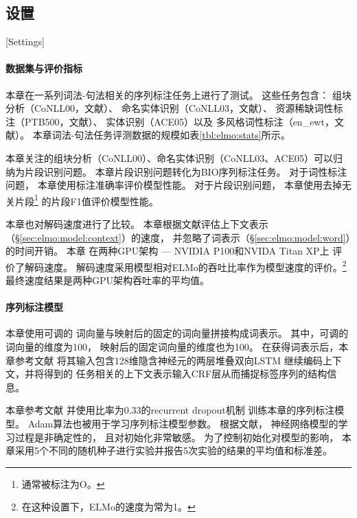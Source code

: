 \subsection{设置}[Settings]
\paragraph{数据集与评价指标}
本章在一系列词法-句法相关的序列标注任务\cite{reimers-gurevych:2017:EMNLP2017}上进行了测试。
这些任务包含：
组块分析（CoNLL00，文献）、
命名实体识别（CoNLL03，文献）、
资源稀缺词性标注（PTB500，文献）、
实体识别（ACE05）以及
多风格词性标注（en\_ewt，文献）。
本章词法-句法任务评测数据的规模如表\ref{tbl:elmo:stats}所示。

本章关注的组块分析（CoNLL00）、命名实体识别（CoNLL03、ACE05）可以归纳为片段识别问题。
本章片段识别问题转化为BIO序列标注任务。
对于词性标注问题，
本章使用标注准确率评价模型性能。
对于片段识别问题，
本章使用去掉无关片段\footnote{通常被标注为O。}
的片段F1值评价模型性能。

本章也对解码速度进行了比较。
本章根据文献评估上下文表示（\S\ref{sec:elmo:model:context}）的速度，
并忽略了词表示（\S\ref{sec:elmo:model:word}）的时间开销。
本章
在两种GPU架构 --- NVIDIA P100和NVIDA Titan XP上
评价了解码速度。
解码速度采用模型相对ELMo的吞吐比率作为模型速度的评价。\footnote{在这种设置下，ELMo的速度为常为1。}
最终速度结果是两种GPU架构吞吐率的平均值。

\paragraph{序列标注模型}
本章使用可调的
词向量与映射后的固定的词向量拼接构成词表示。
其中，可调的词向量的维度为100，
映射后的固定词向量的维度也为100。
在获得词表示后，本章参考文献
将其输入包含128维隐含神经元的两层堆叠双向LSTM\cite{ma-hovy:2016:P16-1}
继续编码上下文，并将得到的
任务相关的上下文表示输入CRF层从而捕捉标签序列的结构信息。

本章参考文献
并使用比率为0.33的recurrent dropout机制\cite{Gal:2016:TGA:3157096.3157211}
训练本章的序列标注模型。
Adam算法也被用于学习序列标注模型参数。
根据文献，
神经网络模型的学习过程是非确定性的，
且对初始化非常敏感。
为了控制初始化对模型的影响，
本章采用5个不同的随机种子进行实验并报告5次实验的结果的平均值和标准差。

